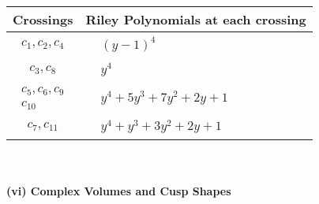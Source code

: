 \documentclass[1p]{elsarticle_modified}
\theoremstyle{definition}
\begin{document}
\begin{tabular}{m{50pt}|m{274pt}}
Crossings & \hspace{64pt}Riley Polynomials at each crossing \\
\hline $$\begin{aligned}c_{1},c_{2},c_{4}\end{aligned}$$&$\begin{aligned}
&(y-1)^4
\end{aligned}$\\
\hline $$\begin{aligned}c_{3},c_{8}\end{aligned}$$&$\begin{aligned}
&y^4
\end{aligned}$\\
\hline $$\begin{aligned}c_{5},c_{6},c_{9}\\c_{10}\end{aligned}$$&$\begin{aligned}
&y^4+5 y^3+7 y^2+2 y+1
\end{aligned}$\\
\hline $$\begin{aligned}c_{7},c_{11}\end{aligned}$$&$\begin{aligned}
&y^4+y^3+3 y^2+2 y+1
\end{aligned}$\\
\hline
\end{tabular}\\~\\
\newpage\flushleft \textbf{(vi) Complex Volumes and Cusp Shapes}
\end{document}
